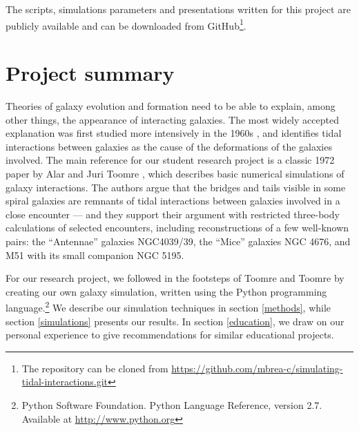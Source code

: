 \documentclass[11pt,twocolumn]{article}
\begin{document}
The scripts, simulations parameters and presentations written for this project are publicly available and can be downloaded from GitHub\footnote{The repository can be cloned from
\href{https://github.com/mbrea-c/simulating-tidal-interactions.git}{https://github.com/mbrea-c/simulating-tidal-interactions.git} }.

\section{Project summary}
\label{SummarySection}

Theories of galaxy evolution and formation need to be able to explain, among other things, the appearance of interacting galaxies. The most widely accepted explanation was first studied more intensively in the 1960s \cite{pfleiderer1960spiral}, and identifies tidal interactions between galaxies as the cause of the deformations of the galaxies involved. The main reference for our student research project is a classic 1972 paper by Alar and Juri Toomre  \cite{toomre1972galactic}, which describes basic numerical simulations of galaxy interactions. The authors argue that the bridges and tails visible in some spiral galaxies are remnants of tidal interactions between galaxies involved in a close encounter --- and they support their argument with restricted three-body calculations of selected encounters, including reconstructions of a few well-known pairs: the ``Antennae'' galaxies NGC4039/39, the ``Mice'' galaxies NGC 4676, and M51 with its small companion NGC 5195. 

For our research project, we followed in the footsteps of Toomre and Toomre by creating our own galaxy simulation, written using the Python programming language.\footnote{Python Software Foundation. Python Language Reference, version 2.7. Available at \href{http://www.python.org}{http://www.python.org}} We describe our simulation techniques in section \ref{methods}, while section \ref{simulations} presents our results. In section \ref{education}, we draw on our personal experience to give recommendations for similar educational projects. 

\end{document}
